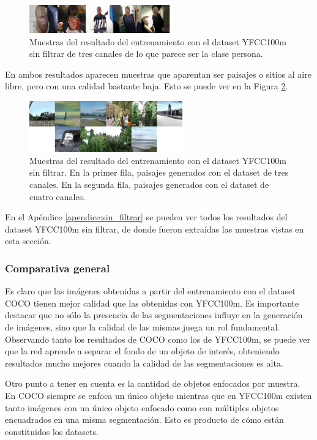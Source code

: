 \documentclass[spanish]{report}
\begin{document}
\begin{figure}[H]
\centering
 \includegraphics[width=230px]{personas_entero_3ch.png}
   \caption{Muestras del resultado del entrenamiento con el dataset YFCC100m sin filtrar de tres canales de lo que parece ser la clase persona.}
  \label{fig:personas_entero_3ch}
\end{figure}


\noindent En ambos resultados aparecen muestras que aparentan ser paisajes o sitios al aire libre, pero con una calidad bastante baja. Esto se puede ver en la Figura \ref{fig:paisajes_entero}.

\begin{figure}[H]
\centering
 \includegraphics[width=250px]{paisajes_entero.png}
   \caption{Muestras del resultado del entrenamiento con el dataset YFCC100m sin filtrar. En la primer fila, paisajes generados con el dataset de tres canales. En la segunda fila, paisajes generados con el dataset de cuatro canales.}
  \label{fig:paisajes_entero}
\end{figure}

En el Apéndice \ref{apendice:sin_filtrar} se pueden ver todos los resultados del dataset YFCC100m sin filtrar, de donde fueron extraídas las muestras vistas en esta sección.

\subsubsection{Comparativa general}

Es claro que las imágenes obtenidas a partir del entrenamiento con el dataset COCO tienen mejor calidad que las obtenidas con YFCC100m. Es importante destacar que no sólo la presencia de las segmentaciones influye en la generación de imágenes, sino que la calidad de las mismas juega un rol fundamental. Observando tanto los resultados de COCO como los de YFCC100m, se puede ver que la red aprende a separar el fondo de un objeto de interés, obteniendo resultados mucho mejores cuando la calidad de las segmentaciones es alta.

Otro punto a tener en cuenta es la cantidad de objetos enfocados por muestra. En COCO siempre se enfoca un único objeto mientras que en YFCC100m existen tanto imágenes con un único objeto enfocado como con múltiples objetos encuadrados en una misma segmentación. Esto es producto de cómo están constituidos los datasets.
\end{document}
